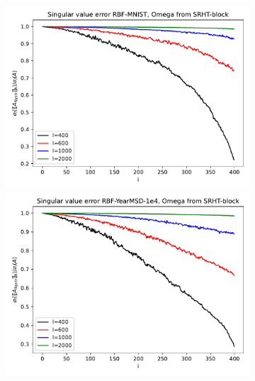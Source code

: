 \documentclass{article}
\theoremstyle{definition}
\begin{document}
\begin{figure}
\centering
\hfill\begin{subfigure}[t]{\textwidth+20pt\relax}
    \includegraphics[width=\dimexpr\linewidth-20pt\relax]
        {../plots/singular_values/singular_values_RBF-MNIST_SRHT-block.pdf}
    \includegraphics[width=\dimexpr\linewidth-20pt\relax]
        {../plots/singular_values/singular_values_RBF-YearMSD-1e4_SRHT-block.pdf}

\end{subfigure}
\end{figure}
\end{document}
